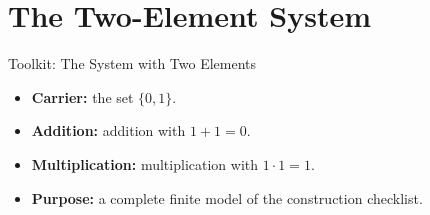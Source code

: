 \section{The Two-Element System}
\begin{toolkitbox}{Toolkit: The System with Two Elements}
\begin{itemize}
  \item \textbf{Carrier:} the set \(\{0,1\}\).
  \item \textbf{Addition:} addition with \(1+1=0\).
  \item \textbf{Multiplication:} multiplication with \(1\cdot 1=1\).
  \item \textbf{Purpose:} a complete finite model of the construction checklist.
\end{itemize}
\end{toolkitbox}


